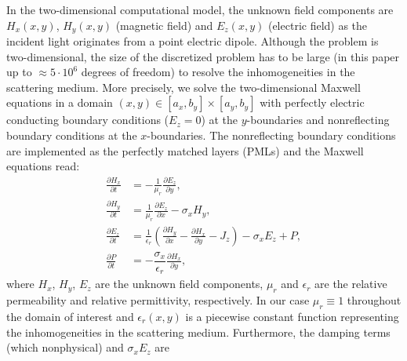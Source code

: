\documentclass[11pt]{elsarticle}
\begin{document}
In the two-dimensional computational model, the unknown field components are 
$H_x(x,y)$, $H_y(x,y)$ (magnetic field) and
$E_z(x,y)$ (electric field) as the incident light originates from a point 
electric dipole.  Although the problem is two-dimensional,
the size of the discretized problem has to be large (in this paper
up to $\approx 5\cdot 10^6$ degrees of freedom) 
to resolve the inhomogeneities in the scattering medium.
More precisely, we solve the two-dimensional Maxwell
equations in a domain $(x,y)\in[a_x,b_y]\times[a_y,b_y]$ with 
perfectly electric conducting boundary conditions 
($E_z=0$) at the $y$-boundaries and nonreflecting
boundary conditions at the $x$-boundaries.
The nonreflecting boundary conditions are implemented 
as the perfectly matched layers (PMLs) and the  Maxwell
equations read:
\begin{equation}
\label{mxw}
\begin{aligned}
\frac{\partial H_{x}}{\partial t} & 
= -\frac{1}{\mu_{r}} 
\frac{\partial E_{z}}{\partial y}, 
\\
\frac{\partial H_{y}}{\partial t} & 
= \frac{1}{\mu_{r}} \frac{\partial E_{z}}{\partial x} - \sigma_{x} H_{y} , 
\\
\frac{\partial E_{z}}{\partial t} & = \frac{1}{\epsilon_{r}} 
\left( \frac{\partial H_{y}}{\partial x} - \frac{\partial H_{x}}{\partial y}  
- J_{z}\right) - \sigma_x E_{z} + P,
\\
\frac{\partial P}{\partial t} & = -\dfrac{\sigma_x}{\epsilon_r}
\frac{\partial H_{x}}{\partial y},
\end{aligned}
\end{equation}
where $H_x$, $H_y$, $E_z$ are the unknown field components,
$\mu_r$ and $\epsilon_r$ are the relative permeability and 
relative permittivity, respectively.  
In our case $\mu_r\equiv 1$ throughout the 
domain of interest and $\epsilon_r(x,y)$ is a piecewise constant
function representing the inhomogeneities in the scattering medium.  
Furthermore, the damping terms 
(which  nonphysical) and $\sigma_x E_z$ are
\end{document}
